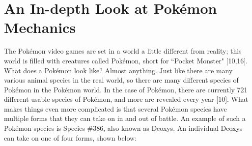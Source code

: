 \documentclass{article}
\begin{document}
\section{An In-depth Look at Pok\'emon Mechanics}
The Pok\'emon video games are set in a world a little different from reality; this world is filled with creatures called Pok\'emon, short for ``Pocket Monster" [10,16]. What does a Pok\'emon look like? Almost anything. Just like there are many various animal species in the real world, so there are many different species of Pok\'emon in the Pok\'emon world. In the case of Pok\'emon, there are currently 721 different usable species of Pok\'emon, and more are revealed every year [10]. What makes things even more complicated is that several Pok\'emon species have multiple forms that they can take on in and out of battle. An example of such a Pok\'emon species is Species \#386, also known as Deoxys. An individual Deoxys can take on one of four forms, shown below:
\end{document}
